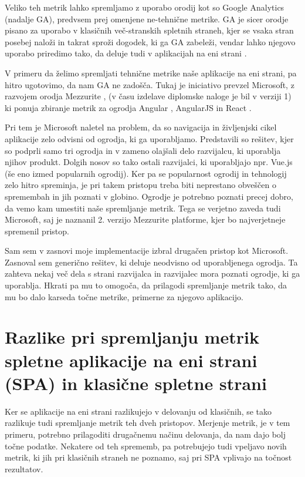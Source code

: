 \documentclass[a4paper, 12pt]{book}
\begin{document}
Veliko teh metrik lahko spremljamo z uporabo orodij kot so Google Analytics \cite{ga_website} (nadalje GA), predvsem prej omenjene ne-tehnične metrike. GA je sicer orodje pisano za uporabo v klasičnih več-stranskih spletnih straneh, kjer se vsaka stran posebej naloži in takrat sproži dogodek, ki ga GA zabeleži, vendar lahko njegovo uporabo priredimo tako, da deluje tudi v aplikacijah na eni strani \cite{ga_spa}.

V primeru da želimo spremljati tehnične metrike naše aplikacije na eni strani, pa hitro ugotovimo, da nam GA ne zadošča. Tukaj je iniciativo prevzel Microsoft, z razvojem orodja Mezzurite \cite{mezzurite_website}, (v času izdelave diplomske naloge je bil v verziji 1) ki ponuja zbiranje metrik za ogrodja Angular \cite{angular_website}, AngularJS \cite{angularjs_website} in React \cite{react_website}.

Pri tem je Microsoft naletel na problem, da so navigacija in življenjski cikel aplikacije zelo odvisni od ogrodja, ki ga uporabljamo. Predstavili so rešitev, kjer so podprli samo tri ogrodja in v zameno olajšali delo razvijalcu, ki uporablja njihov produkt. Dolgih nosov so tako ostali razvijalci, ki uporabljajo npr. Vue.js (še eno izmed popularnih ogrodij). Ker pa se popularnost ogrodij in tehnologij zelo hitro spreminja, je pri takem pristopu treba biti neprestano obveščen o spremembah in jih poznati v globino. Ogrodje je potrebno poznati  precej dobro, da vemo kam umestiti naše spremljanje metrik. Tega se verjetno zaveda tudi Microsoft, saj je naznanil 2. verzijo Mezzurite platforme, kjer bo najverjetneje spremenil pristop.

Sam sem v zasnovi moje implementacije izbral drugačen pristop kot Microsoft. Zasnoval sem generično rešitev, ki deluje neodvisno od uporabljenega ogrodja. Ta zahteva nekaj več dela s strani razvijalca in razvijalec mora poznati ogrodje, ki ga uporablja. Hkrati pa mu to omogoča, da prilagodi spremljanje metrik tako, da mu bo dalo karseda točne metrike, primerne za njegovo aplikacijo.

\chapter{Razlike pri spremljanju metrik spletne aplikacije na eni strani (SPA) in klasične spletne strani}
\label{ch1}

Ker se aplikacije na eni strani razlikujejo v delovanju od klasičnih, se tako razlikuje tudi spremljanje metrik teh dveh pristopov. Merjenje metrik, je v tem primeru, potrebno prilagoditi drugačnemu načinu delovanja, da nam dajo bolj točne podatke. Nekatere od teh sprememb, pa potrebujejo tudi vpeljavo novih metrik, ki jih pri klasičnih straneh ne poznamo, saj pri SPA vplivajo na točnost rezultatov.
\end{document}
